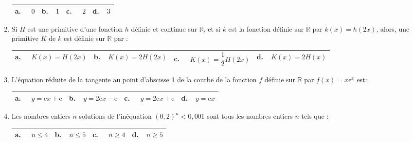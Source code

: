 \documentclass[10pt]{article}
\providecommand{\R}{\mathbb{R}}
\begin{document}
\begin{enumerate}
\begin{center}
\begin{tabularx}{\linewidth}{|*{4}{X|}}\hline
\textbf{a.~~} $0$&\textbf{b.~~}$1$&\textbf{c.~~} $2$&\textbf{d.~~}$3$\\ \hline
\end{tabularx}
\end{center}

\item Si $H$ est une primitive d'une fonction $h$ définie et continue sur $\R$, 
et si $k$ est la fonction définie sur $\R$ par $k(x) = h(2x)$, 
alors, une primitive $K$ de $k$ est définie sur $\R$ par :

\begin{center}
\begin{tabularx}{\linewidth}{|*{4}{X|}}\hline
\textbf{a.~~} $K(x) =H(2x)$&\textbf{b.~~}$K(x) =2H(2x)$&\textbf{c.~~} $ K(x) =\dfrac{1}{2}H(2x)$&\textbf{d.~~}$K(x) =2H(x)$\rule[-3mm]{0mm}{9mm}\\ \hline
\end{tabularx}
\end{center}

\item L'équation réduite de la tangente au point d'abscisse 1 de la courbe de la fonction $f$ définie sur $\R$ par $f(x) = x\text{e}^x$ est:

\begin{center}
\begin{tabularx}{\linewidth}{|*{4}{X|}}\hline
\textbf{a.~~} $y = \text{e}x + \text{e}$&\textbf{b.~~}$y =2\text{e}x - \text{e}$&\textbf{c.~~} $y = 2\text{e}x +  \text{e}$&\textbf{d.~~}$y = \text{e}x$\\ \hline
\end{tabularx}
\end{center}

\item Les nombres entiers $n$ solutions de l'inéquation $(0,2)^n < 0,001$ sont tous les
nombres entiers $n$ tels que :

\begin{center}
\begin{tabularx}{\linewidth}{|*{4}{X|}}\hline
\textbf{a.~~} $n \leqslant 4$&\textbf{b.~~}$n\leqslant 5$&\textbf{c.~~} $n \geqslant 4$ &\textbf{d.~~}$n \geqslant 5$\\ \hline
\end{tabularx}
\end{center}

\end{enumerate}

\bigskip
\end{document}
